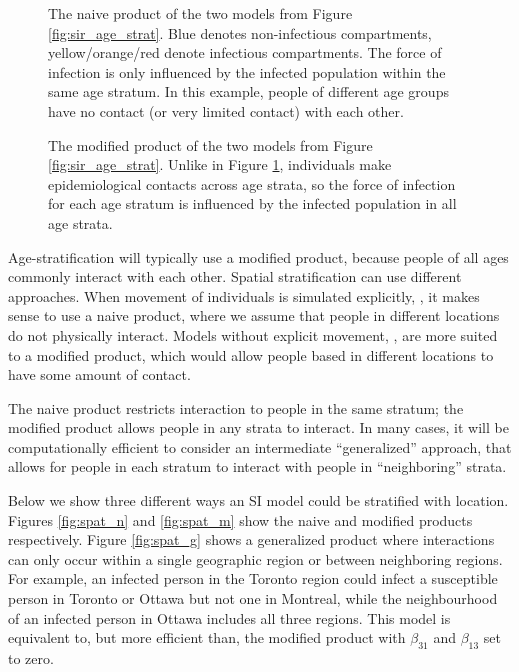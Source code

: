 \begin{figure}
    \centering
    
    \caption{The naive product of the two models from Figure \ref{fig:sir_age_strat}. Blue denotes non-infectious compartments, yellow/orange/red denote infectious compartments. The force of infection is only influenced by the infected population within the same age stratum. In this example, people of different age groups have no contact (or very limited contact) with each other.}
    \label{fig:naive_product}
\end{figure}

\begin{figure}
    \centering
    
    \caption{The modified product of the two models from Figure \ref{fig:sir_age_strat}. Unlike in Figure \ref{fig:naive_product}, individuals make epidemiological contacts across age strata, so the force of infection for each age stratum is influenced by the infected population in all age strata.}
    \label{fig:modified_product}
\end{figure}

\FloatBarrier

Age-stratification will typically use a modified product, because people of all ages commonly interact with each other. Spatial stratification can use different approaches. When movement of individuals is simulated explicitly, \cite[e.g.][]{mohammadi2023importation}, it makes sense to use a naive product, where we assume that people in different locations do not physically interact. Models without explicit movement, \cite[e.g.][]{dietz1995structured}, are more suited to a modified product, which would allow people based in different locations to have some amount of contact. 

The naive product restricts interaction to people in the same stratum; the modified product allows people in any strata to interact. In many cases, it will be computationally efficient to consider an intermediate “generalized” approach, that allows for people in each stratum to interact with people in “neighboring” strata.

Below we show three different ways an SI model could be stratified with location. Figures \ref{fig:spat_n} and \ref{fig:spat_m} show the naive and modified products respectively. Figure \ref{fig:spat_g} shows a generalized product where interactions can only occur within a single geographic region or between neighboring regions. For example, an infected person in the Toronto region could infect a susceptible person in Toronto or Ottawa but not one in Montreal, while the neighbourhood of an infected person in Ottawa includes all three regions.
This model is equivalent to, but more efficient than, the modified product with $\beta_{31}$ and $\beta_{13}$ set to zero. 

